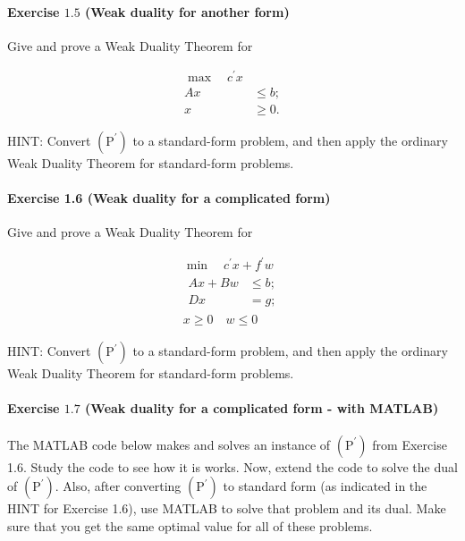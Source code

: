 \paragraph{Exercise $1.5$ (Weak duality for another form)}

Give and prove a Weak Duality Theorem for

$$
\begin{aligned}
\max \quad c^{\prime} x & \\
A x & \leq b ; \\
x & \geq 0 .
\end{aligned}
$$

HINT: Convert $\left(\mathrm{P}^{\prime}\right)$ to a standard-form problem, and then apply the ordinary Weak Duality Theorem for standard-form problems. \paragraph{Exercise 1.6 (Weak duality for a complicated form)}

Give and prove a Weak Duality Theorem for

$$
\begin{gathered}
\min \quad c^{\prime} x+f^{\prime} w \\
\begin{aligned}
A x+B w & \leq b ; \\
D x &=g ;
\end{aligned} \\
x \geq 0 \quad w \leq 0
\end{gathered}
$$

HINT: Convert $\left(\mathrm{P}^{\prime}\right)$ to a standard-form problem, and then apply the ordinary Weak Duality Theorem for standard-form problems.

\paragraph{Exercise $1.7$ (Weak duality for a complicated form - with MATLAB)}

The MATLAB code below makes and solves an instance of $\left(\mathrm{P}^{\prime}\right)$ from Exercise 1.6. Study the code to see how it is works. Now, extend the code to solve the dual of $\left(\mathrm{P}^{\prime}\right)$. Also, after converting $\left(\mathrm{P}^{\prime}\right)$ to standard form (as indicated in the HINT for Exercise 1.6), use MATLAB to solve that problem and its dual. Make sure that you get the same optimal value for all of these problems.





